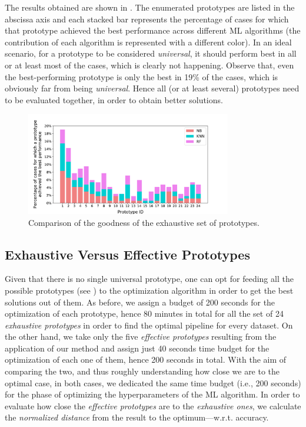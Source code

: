 The results obtained are shown in .
The enumerated prototypes are listed in the abscissa axis and each stacked bar represents the percentage of cases for which that prototype achieved the best performance across different ML algorithms (the contribution of each algorithm is represented with a different color).
In an ideal scenario, for a prototype to be considered \textit{universal}, it should perform best in all or at least most of the cases, which is clearly not happening.
Observe that, even the best-performing prototype is only the best in 19\% of the cases, which is obviously far from being \textit{universal}.
Hence all (or at least several) prototypes need to be evaluated together, in order to obtain better solutions.

\begin{figure}[t]
    \centering
    \includegraphics[width=0.8\textwidth]{chapters/data-centric/supervised/img/evaluation1.pdf}
    \caption{Comparison of the goodness of the exhaustive set of prototypes.}
    \label{effective-fig:eval-universal-pipeline}
\end{figure}

\subsection{Exhaustive Versus Effective Prototypes}
\label{effective-sec:eval-our-vs-rest}
Given that there is no single universal prototype, one can opt for feeding all the possible prototypes (see ) to the optimization algorithm in order to get the best solutions out of them.
As before, we assign a budget of 200 seconds for the optimization of each prototype, hence 80 minutes in total for all the set of 24 \textit{exhaustive prototypes} in order to find the optimal pipeline for every dataset.
On the other hand, we take only the five \textit{effective prototypes} resulting from the application of our method and assign just 40 seconds time budget for the optimization of each one of them, hence 200 seconds in total. With the aim of comparing the two, and thus roughly understanding how close we are to the optimal case, in both cases, we dedicated the same time budget (i.e., 200 seconds) for the phase of optimizing the hyperparameters of the ML algorithm.
In order to evaluate how close the \textit{effective prototypes} are to the \textit{exhaustive ones}, we calculate the \textit{normalized distance} from the result to the optimum---w.r.t. accuracy.

